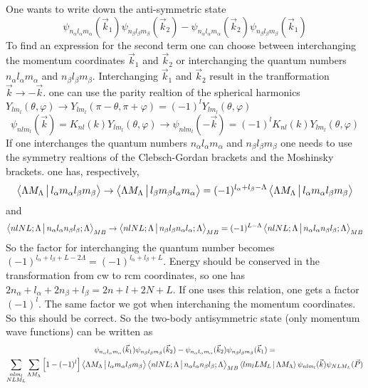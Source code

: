 \documentclass[12pt]{article}
\begin{document}
One wants to write down the anti-symmetric state
\begin{equation}
\psi_{n_\alpha l_\alpha  m_\alpha }(\vec{k}_1)\psi_{n_\beta l_\beta m_\beta}(\vec{k}_2) - \psi_{n_\alpha l_\alpha  m_\alpha }(\vec{k}_2)\psi_{n_\beta l_\beta m_\beta}(\vec{k}_1)
\end{equation}
To find an expression for the second term one can choose between interchanging the momentum coordinates $\vec{k}_1$ and $\vec{k}_2$ or interchanging the quantum numbers $n_\alpha l_\alpha  m_\alpha$ and $n_\beta l_\beta m_\beta$.
Interchanging $\vec{k}_1$ and $\vec{k}_2$ result in the tranfformation $\vec{k} \rightarrow - \vec{k}$. one can use the parity realtion of the spherical harmonics $Y_{lm_l}(\theta, \varphi ) \rightarrow Y_{lm_l}(\pi - \theta, \pi + \varphi ) = (-1)^l Y_{lm_l}(\theta, \varphi )  $
\begin{equation}
\psi_{nlm_l}(\vec{k}) = K_{nl}(k) Y_{lm_l}(\theta, \varphi ) \rightarrow \psi_{nlm_l}(-\vec{k})  = (-1)^l K_{nl}(k) Y_{lm_l}(\theta, \varphi ) 
\end{equation}
If one interchanges the quantum numbers $n_\alpha l_\alpha  m_\alpha$ and $n_\beta l_\beta m_\beta$ one needs to use the symmetry realtions of the Clebsch-Gordan brackets and the Moshinsky brackets. one has, respectively,
\begin{equation} \label{CG}
\Braket{\Lambda M_\Lambda | l_\alpha m_\alpha l_\beta m_\beta} \rightarrow \Braket{\Lambda M_\Lambda |  l_\beta m_\beta l_\alpha m_\alpha}  = (-1)^{l_\alpha + l_\beta - \Lambda} \Braket{\Lambda M_\Lambda | l_\alpha m_\alpha l_\beta m_\beta}
\end{equation}
and 
\begin{equation}
\Braket{nlNL;\Lambda |  n_\alpha l_\alpha n_\beta l_\beta;\Lambda}_{MB} \rightarrow  \Braket{nlNL;\Lambda |  n_\beta l_\beta  n_\alpha l_\alpha;\Lambda}_{MB}  = (-1)^{L-\Lambda} \Braket{nlNL;\Lambda |  n_\alpha l_\alpha n_\beta l_\beta;\Lambda}_{MB} 
\end{equation}
So the factor for interchanging the quantum number becomes $(-1)^{l_\alpha + l_\beta +  L - 2\Lambda}= (-1)^{l_\alpha + l_\beta +  L }$. Energy should be conserved in the transformation from cw to rcm coordinates, so one has $2n_\alpha + l_\alpha +2n_\beta + l_\beta = 2n + l + 2N + L$. If one uses this relation, one gets a factor $(-1)^l$. The same factor we got when interchaning the momentum coordinates. So this should be correct.
So the two-body antisymmetric state (only momentum wave functions) can be written as
\begin{multline} \label{anti}
\psi_{n_\alpha l_\alpha  m_\alpha }(\vec{k}_1)\psi_{n_\beta l_\beta m_\beta}(\vec{k}_2) - \psi_{n_\alpha l_\alpha  m_\alpha }(\vec{k}_2) \psi_{n_\beta l_\beta m_\beta}(\vec{k}_1)   =  \\ \sum_{\substack{nlm_l \\ NLM_L}}\sum_{\Lambda M_\Lambda} \left[ 1-(-1)^l \right] \Braket{\Lambda M_\Lambda | l_\alpha m_\alpha l_\beta m_\beta}\Braket{nlNL;\Lambda |  n_\alpha l_\alpha n_\beta l_\beta;\Lambda}_{MB}  \Braket{lm_l L M_L|\Lambda M_\Lambda}  \psi_{nlm_l}(\vec{k}) \psi_{NLM_L}(\vec{P}) 
\end{multline}
\end{document}
